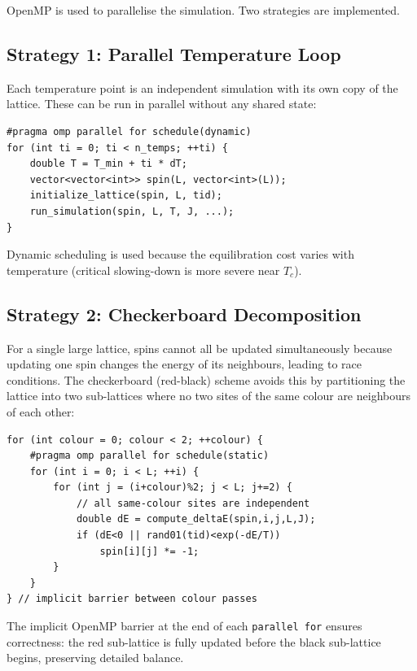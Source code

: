 \documentclass[conference]{IEEEtran}
\begin{document}
OpenMP is used to parallelise the simulation. Two strategies are implemented.

\subsection{Strategy 1: Parallel Temperature Loop}

Each temperature point is an independent simulation with its own copy of the
lattice. These can be run in parallel without any shared state:

\begin{lstlisting}[caption={Strategy 1 — parallel temperature sweep}]
#pragma omp parallel for schedule(dynamic)
for (int ti = 0; ti < n_temps; ++ti) {
    double T = T_min + ti * dT;
    vector<vector<int>> spin(L, vector<int>(L));
    initialize_lattice(spin, L, tid);
    run_simulation(spin, L, T, J, ...);
}
\end{lstlisting}

Dynamic scheduling is used because the equilibration cost varies with
temperature (critical slowing-down is more severe near $T_c$).

\subsection{Strategy 2: Checkerboard Decomposition}

For a single large lattice, spins cannot all be updated simultaneously
because updating one spin changes the energy of its neighbours, leading to
race conditions. The checkerboard (red-black) scheme avoids this by
partitioning the lattice into two sub-lattices where no two sites of the
same colour are neighbours of each other:

\begin{lstlisting}[caption={Strategy 2 — checkerboard sweep}]
for (int colour = 0; colour < 2; ++colour) {
    #pragma omp parallel for schedule(static)
    for (int i = 0; i < L; ++i) {
        for (int j = (i+colour)%2; j < L; j+=2) {
            // all same-colour sites are independent
            double dE = compute_deltaE(spin,i,j,L,J);
            if (dE<0 || rand01(tid)<exp(-dE/T))
                spin[i][j] *= -1;
        }
    }
} // implicit barrier between colour passes
\end{lstlisting}

The implicit OpenMP barrier at the end of each \texttt{parallel for}
ensures correctness: the red sub-lattice is fully updated before the
black sub-lattice begins, preserving detailed balance.
\end{document}
